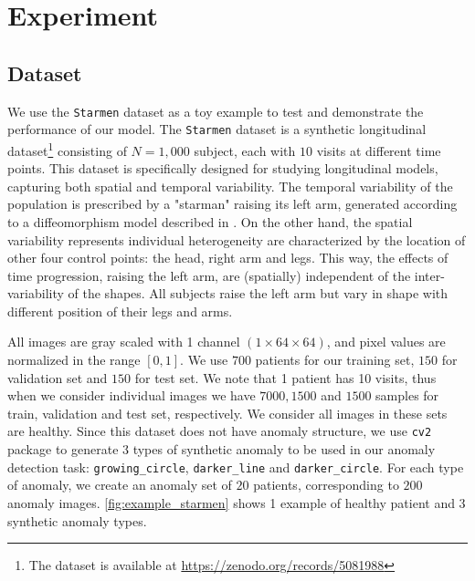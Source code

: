 \chapter{Experiment}
\label{chap:experiment}
\minitoc

\section{Dataset}
\label{sec:dataset}


We use the \texttt{Starmen} dataset as a toy example to test and demonstrate the performance of our model. The \texttt{Starmen} dataset is a synthetic longitudinal dataset\footnote{The dataset is available at \href{https://zenodo.org/records/5081988}{https://zenodo.org/records/5081988}} consisting of $N = 1,000$ subject, each with $10$ visits at different time points. This dataset is specifically designed for studying longitudinal models, capturing both spatial and temporal variability. The temporal variability of the population is prescribed by a "starman" raising its left arm, generated according to a diffeomorphism model described in \cite{bôneStarmenDataset2018}. On the other hand, the spatial variability represents individual heterogeneity are characterized by the location of other four control points: the head, right arm and legs. This way, the effects of time progression, raising the left arm, are (spatially) independent of the inter-variability of the shapes. All subjects raise the left arm but vary in shape with different position of their legs and arms.

All images are gray scaled with 1 channel $(1 \times 64 \times 64)$, and pixel values are normalized in the range $[0, 1]$. We use $700$ patients for our training set, $150$ for validation set and $150$ for test set. We note that 1 patient has 10 visits, thus when we consider individual images we have $7000, 1500$ and $1500$ samples for train, validation and test set, respectively. We consider all images in these sets are healthy. Since this dataset does not have anomaly structure, we use \texttt{cv2} package to generate 3 types of synthetic anomaly to be used in our anomaly detection task: \texttt{growing\_circle}, \texttt{darker\_line} and \texttt{darker\_circle}. For each type of anomaly, we create an anomaly set of $20$ patients, corresponding to $200$ anomaly images. \cref{fig:example_starmen} shows 1 example of healthy patient and 3 synthetic anomaly types.

